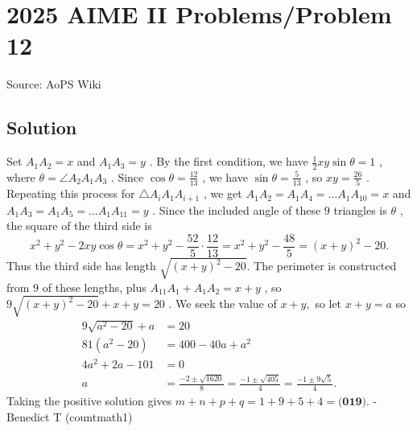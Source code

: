 \documentclass[12pt]{article}
\begin{document}
\section*{{2025 AIME II Problems/Problem 12}}
Source: AoPS Wiki

\subsection*{Solution}
Set $A_1A_2 = x$ and $A_1A_3 = y$ . By the first condition, we have $\frac{1}{2}xy\sin\theta = 1$ , where $\theta = \angle A_2 A_1 A_3$ . Since $\cos\theta = \frac{12}{13}$ , we have $\sin\theta = \frac{5}{13}$ , so $xy = \frac{26}{5}$ . Repeating this process for $\triangle A_i A_1 A_{i+1}$ , we get $A_1A_2 = A_1A_4 = \ldots A_1A_{10} = x$ and $A_1A_3 = A_1A_5 = \ldots A_1A_{11} = y$ . Since the included angle of these $9$ triangles is $\theta$ , the square of the third side is \[x^2 + y^2 - 2xy\cos\theta = x^2 + y^2 - \frac{52}{5}\cdot \frac{12}{13} = x^2 + y^2 - \frac{48}{5} = (x+y)^2 - 20.\] Thus the third side has length $\sqrt{(x+y)^2 - 20}.$ The perimeter is constructed from $9$ of these lengths, plus $A_{11}A_1 + A_1A_2 = x + y$ , so $9\sqrt{(x+y)^2 - 20} + x + y = 20$ . We seek the value of $x + y,$ so let $x + y = a$ so \begin{align*} 9\sqrt{a^2 - 20} + a &= 20\\ 81(a^2 - 20) &= 400 - 40a + a^2\\ 4a^2 + 2a - 101 &= 0 \\ a &= \frac{-2 \pm \sqrt{1620}}{8} = \frac{-1 \pm \sqrt{405}}{4} = \frac{-1 \pm 9\sqrt{5}}{4}. \end{align*} Taking the positive solution gives $m + n + p + q = 1 + 9 + 5 + 4 = \boxed{\textbf{(019)}}.$ -Benedict T (countmath1)
\end{document}
